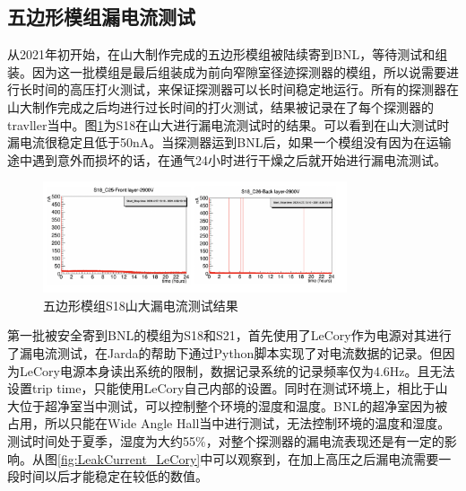 \subsection{五边形模组漏电流测试}

从2021年初开始，在山大制作完成的五边形模组被陆续寄到BNL，等待测试和组装。因为这一批模组是最后组装成为前向窄隙室径迹探测器的模组，所以说需要进行长时间的高压打火测试，来保证探测器可以长时间稳定地运行。所有的探测器在山大制作完成之后均进行过长时间的打火测试，结果被记录在了每个探测器的travller当中。图\ref{fig:S18_traveller}为S18在山大进行漏电流测试时的结果。可以看到在山大测试时漏电流很稳定且低于50nA。当探测器运到BNL后，如果一个模组没有因为在运输途中遇到意外而损坏的话，在通气24小时进行干燥之后就开始进行漏电流测试。
\begin{figure}[htb]
    \begin{center}
    \includegraphics[width=0.8\textwidth,clip]{figures/Chapter3/S18_traveller.png}
    \end{center}
    \caption[五边形模组S18山大漏电流测试结果]{五边形模组S18山大漏电流测试结果}
    \label{fig:S18_traveller}
\end{figure}

第一批被安全寄到BNL的模组为S18和S21，首先使用了LeCory作为电源对其进行了漏电流测试，在Jarda的帮助下通过Python脚本实现了对电流数据的记录。但因为LeCory电源本身读出系统的限制，数据记录系统的记录频率仅为4.6Hz。且无法设置trip time，只能使用LeCory自己内部的设置。同时在测试环境上，相比于山大位于超净室当中测试，可以控制整个环境的湿度和温度。BNL的超净室因为被占用，所以只能在Wide Angle Hall当中进行测试，无法控制环境的温度和湿度。测试时间处于夏季，湿度为大约55\%，对整个探测器的漏电流表现还是有一定的影响。从图\ref{fig:LeakCurrent_LeCory}中可以观察到，在加上高压之后漏电流需要一段时间以后才能稳定在较低的数值。

